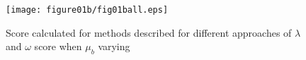 \documentclass[10pt, a4paper]{article}
\newcommand{\m}[1]{\boldsymbol{#1}}
\begin{document}
\begin{figure}[!t]
\centering
\texttt{[image: figure01b/fig01ball.eps]}
\caption{Score calculated for methods described for different approaches of $\lambda$ and $\omega$ score when $\mu_b$ varying}
\label{fig:mu_varying3}
\end{figure}


%
%
%
%
%
\end{document}

